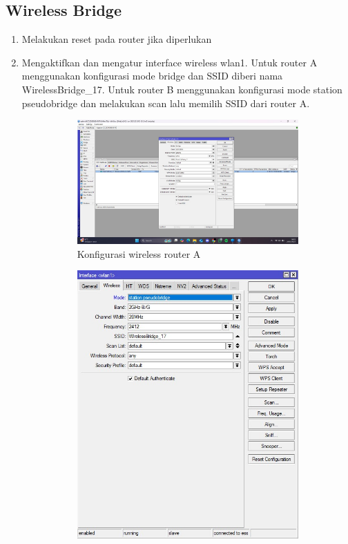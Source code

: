 \subsection{Wireless Bridge}
\begin{enumerate}
	\item Melakukan reset pada router jika diperlukan
	\item Mengaktifkan dan mengatur interface wireless wlan1. Untuk router A menggunakan konfigurasi mode bridge dan SSID diberi nama WirelessBridge\_17. Untuk router B menggunakan konfigurasi mode station pseudobridge dan melakukan scan lalu memilih SSID dari router A.
	\begin{figure}[H]
		\centering
		\begin{subfigure}[b]{0.4\linewidth}
			\centering
			\includegraphics[width=\linewidth]{P3/img/ptp rtrA 1.jpg}
			\caption{Konfigurasi wireless router A\label{fig:konfigurasiR1}}
		\end{subfigure}
		\begin{subfigure}[b]{0.4\linewidth}
			\centering
			\includegraphics[width=\linewidth]{P3/img/wb rtrB 1.jpg}

\end{subfigure}
\end{figure}
\end{enumerate}
